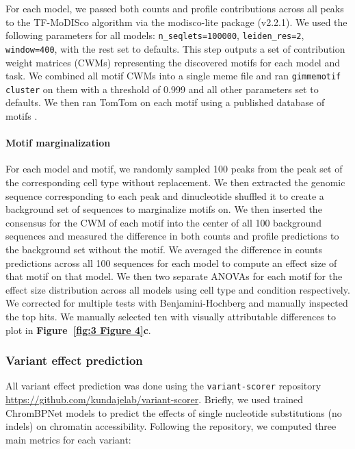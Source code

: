 For each model, we passed both counts and profile contributions across all peaks to the TF-MoDISco \cite{Shrikumar2018-sb} algorithm via the modisco-lite package (v2.2.1). We used the following parameters for all models: \texttt{n\_seqlets=100000}, \texttt{leiden\_res=2}, \texttt{window=400}, with the rest set to defaults. This step outputs a set of contribution weight matrices (CWMs) representing the discovered motifs for each model and task. We combined all motif CWMs into a single meme file and ran \texttt{gimmemotif} \cite{van-Heeringen2011-tx} \texttt{cluster} on them with a threshold of 0.999 and all other parameters set to defaults. We then ran TomTom \cite{Gupta2007-zw} on each motif using a published database of motifs \cite{Vierstra2020-te}.

\paragraph{Motif marginalization}

For each model and motif, we randomly sampled 100 peaks from the peak set of the corresponding cell type without replacement. We then extracted the genomic sequence corresponding to each peak and dinucleotide shuffled it to create a background set of sequences to marginalize motifs on. We then inserted the consensus for the CWM of each motif into the center of all 100 background sequences and measured the difference in both counts and profile predictions to the background set without the motif. We averaged the difference in counts predictions across all 100 sequences for each model to compute an effect size of that motif on that model. We then two separate ANOVAs for each motif for the effect size distribution across all models using cell type and condition respectively. We corrected for multiple tests with Benjamini-Hochberg \cite{Benjamini1995-da} and manually inspected the top hits. We manually selected ten with visually attributable differences to plot in \textbf{Figure~\ref{fig:3 Figure 4}c}.

\subsubsection{Variant effect prediction}

All variant effect prediction was done using the \texttt{variant-scorer} repository \url{https://github.com/kundajelab/variant-scorer}. Briefly, we used trained ChromBPNet models to predict the effects of single nucleotide substitutions (no indels) on chromatin accessibility. Following the repository, we computed three main metrics for each variant:

